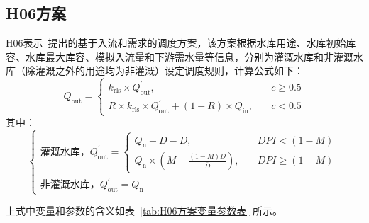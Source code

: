 \subsection{H06方案}
H06表示~\citet{hanasaki2006reservoir}提出的基于入流和需求的调度方案，该方案根据水库用途、水库初始库容、水库最大库容、模拟入流量和下游需水量等信息，分别为灌溉水库和非灌溉水库（除灌溉之外的用途均为非灌溉）设定调度规则，计算公式如下：
\begin{equation}
Q_{\mathrm{out}}=\begin{cases}
k_{\mathrm{rls}} \times Q_{\mathrm{out}}^{'}, & \quad c \geqslant 0.5 \\
R \times k_{\mathrm{rls}} \times Q_{\mathrm{out}}^{'}+\left(1-R\right) \times Q_{\mathrm{in}}, & \quad c<0.5
  \end{cases}
\end{equation}
%
其中：
\begin{equation}
\begin{cases}
\text{灌溉水库，} Q_{\mathrm{out}}^{'}= \begin{cases}
Q_{\mathrm{n}}+D-\overline{D}, &\quad DPI<(1-M)\\
Q_{\mathrm{n}} \times \left(M+\frac{\left(1-M\right)D}{\overline{D}}\right), &\quad DPI \geqslant (1-M)
\end{cases}\\
\text{非灌溉水库，} Q_{\mathrm{out}}^{'}=Q_{\mathrm{n}}
\end{cases}
\end{equation}

上式中变量和参数的含义如表~\ref{tab:H06方案变量参数表} 所示。

